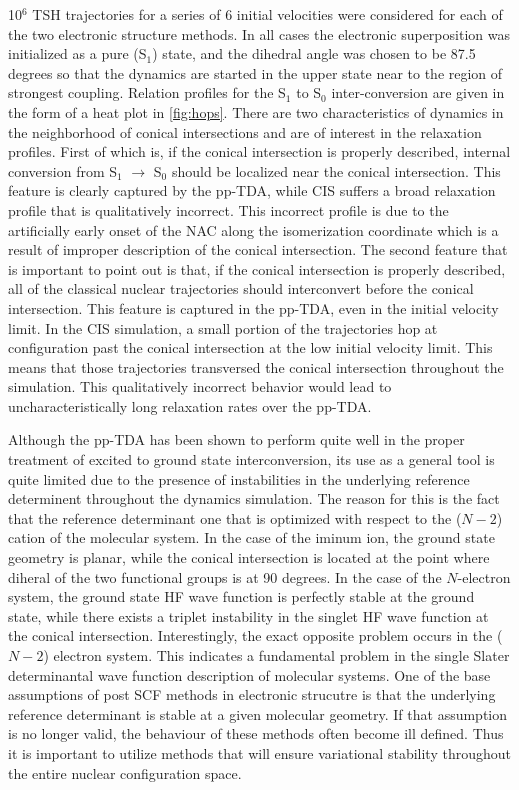 10$^6$ TSH trajectories for a series of 6 initial velocities were considered for
each of the two electronic structure methods.  In all cases the electronic
superposition was initialized as a pure (S$_1$) state, and the dihedral angle
was chosen to be 87.5 degrees so that the dynamics are started in the upper
state near to the region of strongest coupling. Relation profiles for the S$_1$
to S$_0$ inter-conversion are given in the form of a heat plot in
\cref{fig:hops}. There are two characteristics of dynamics in the neighborhood
of conical intersections and are of interest in the relaxation
profiles\cite{Hynes14_97}. First of which is, if the conical intersection is
properly described, internal conversion from S$_1$ $\rightarrow$ S$_0$ should be
localized near the conical intersection. This feature is clearly captured by
the pp-TDA, while CIS suffers a broad relaxation profile that is qualitatively
incorrect. This incorrect profile is due to the artificially early onset of the
NAC along the isomerization coordinate which is a result of improper description
of the conical intersection. The second feature that is important to point out
is that, if the conical intersection is properly described, all of the classical
nuclear trajectories should interconvert before the conical intersection. This
feature is captured in the pp-TDA, even in the initial velocity limit. In the
CIS simulation, a small portion of the trajectories hop at configuration past
the conical intersection at the low initial velocity limit. This means that
those trajectories transversed the conical intersection throughout the
simulation. This qualitatively incorrect behavior would lead to
uncharacteristically long relaxation rates over the pp-TDA.

Although the pp-TDA has been shown to perform quite well in the proper treatment
of excited to ground state interconversion, its use as a general tool is quite
limited due to the presence of instabilities in the underlying reference
determinent throughout the dynamics simulation. The reason for this is the fact
that the reference determinant one that is optimized with respect to the ($N-2$)
cation of the molecular system. In the case of the iminum ion, the ground state
geometry is planar, while the conical intersection is located at the point where
diheral of the two functional groups is at 90 degrees. In the case of the
$N$-electron system, the ground state HF wave function is perfectly stable at
the ground state, while there exists a triplet instability in the singlet HF
wave function at the conical intersection. Interestingly, the exact opposite
problem occurs in the ($N-2$) electron system. This indicates a fundamental
problem in the single Slater determinantal wave function description of
molecular systems. One of the base assumptions of post SCF methods in electronic
strucutre is that the underlying reference determinant is stable at a given
molecular geometry. If that assumption is no longer valid, the behaviour of
these methods often become ill defined. Thus it is important to utilize methods
that will ensure variational stability throughout the entire nuclear
configuration space.

